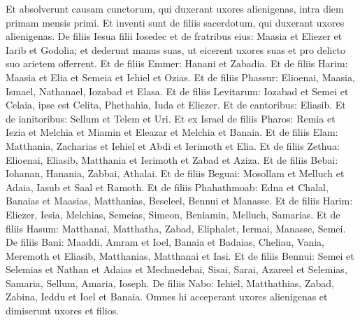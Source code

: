 \begin{biblechapter}
\verse Et absolverunt causam cunctorum, qui duxerant uxores alienigenas, intra diem primam mensis primi. 
\verse Et inventi sunt de filiis sacerdotum, qui duxerant uxores alienigenas. De filiis Iesua filii Iosedec et de fratribus eius: Maasia et Eliezer et Iarib et Godolia; 
\verse et dederunt manus suas, ut eicerent uxores suas et pro delicto suo arietem offerrent. 
\verse Et de filiis Emmer: Hanani et Zabadia. 
\verse Et de filiis Harim: Maasia et Elia et Semeia et Iehiel et Ozias. 
\verse Et de filiis Phassur: Elioenai, Maasia, Ismael, Nathanael, Iozabad et Elasa. 
\verse Et de filiis Levitarum: Iozabad et Semei et Celaia, ipse est Celita, Phethahia, Iuda et Eliezer. 
\verse Et de cantoribus: Eliasib. Et de ianitoribus: Sellum et Telem et Uri. 
\verse Et ex Israel de filiis Pharos: Remia et Iezia et Melchia et Miamin et Eleazar et Melchia et Banaia. 
\verse Et de filiis Elam: Matthania, Zacharias et Iehiel et Abdi et Ierimoth et Elia. 
\verse Et de filiis Zethua: Elioenai, Eliasib, Matthania et Ierimoth et Zabad et Aziza. 
\verse Et de filiis Bebai: Iohanan, Hanania, Zabbai, Athalai. 
\verse Et de filiis Beguai: Mosollam et Melluch et Adaia, Iasub et Saal et Ramoth. 
\verse Et de filiis Phahathmoab: Edna et Chalal, Banaias et Maasias, Matthanias, Beseleel, Bennui et Manasse. 
\verse Et de filiis Harim: Eliezer, Iesia, Melchias, Semeias, Simeon,  
\verse Beniamin, Melluch, Samarias. 
\verse Et de filiis Hasum: Matthanai, Matthatha, Zabad, Eliphalet, Iermai, Manasse, Semei. 
\verse De filiis Bani: Maaddi, Amram et Ioel, 
\verse Banaia et Badaias, Cheliau, 
\verse Vania, Meremoth et Eliasib,  
\verse Matthanias, Matthanai et Iasi. 
\verse Et de filiis Bennui: Semei 
\verse et Selemias et Nathan et Adaias 
\verse et Mechnedebai, Sisai, Sarai, 
\verse Azareel et Selemias, Samaria, 
\verse Sellum, Amaria, Ioseph. 
\verse De filiis Nabo: Iehiel, Matthathias, Zabad, Zabina, Ieddu et Ioel et Banaia. 
\verse Omnes hi acceperant uxores alienigenas et dimiserunt uxores et filios.
\end{biblechapter}
